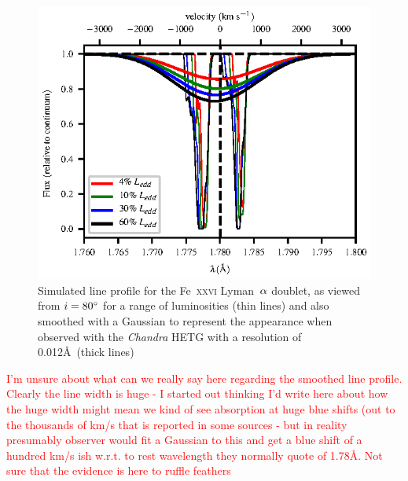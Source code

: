 \documentclass[a4paper,fleqn,usenatbib]{mnras}
\begin{document}
\begin{figure}
\includegraphics[width=\columnwidth]{figures/80_degrees_fe26_smooth.eps}
\caption{Simulated line profile for the Fe~\textsc{xxvi} Lyman~$\rm{\alpha}$
doublet, as viewed from $i = 80\degree$ for a range
of luminosities (thin lines) and also smoothed with a Gaussian to represent the appearance when
observed with the \emph{Chandra} HETG with a resolution of 0.012\AA~(thick lines)}
\label{figure:line26_smooth}
\end{figure}


\textcolor{red}{I'm unsure about what can we really say
here regarding the smoothed line profile. Clearly the line width is huge - I started out thinking I'd 
write here about how the 
huge width might mean we kind of see absorption at huge blue shifts (out to the thousands of km/s 
that is reported in some sources - but in reality presumably
observer would fit a Gaussian to this and get a blue shift of a hundred km/s ish w.r.t. to rest
wavelength they normally quote of 1.78\AA. Not sure that the evidence is here to ruffle feathers}
\end{document}
